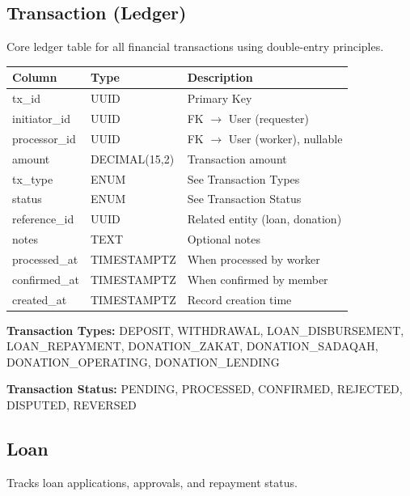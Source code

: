 \documentclass[11pt,a4paper]{article}
\begin{document}
\subsection{Transaction (Ledger)}

Core ledger table for all financial transactions using double-entry principles.

\begin{tabular}{@{}p{4cm}p{3cm}p{6cm}@{}}
\toprule
\textbf{Column} & \textbf{Type} & \textbf{Description} \\
\midrule
tx\_id & UUID & Primary Key \\
initiator\_id & UUID & FK $\rightarrow$ User (requester) \\
processor\_id & UUID & FK $\rightarrow$ User (worker), nullable \\
amount & DECIMAL(15,2) & Transaction amount \\
tx\_type & ENUM & See Transaction Types \\
status & ENUM & See Transaction Status \\
reference\_id & UUID & Related entity (loan, donation) \\
notes & TEXT & Optional notes \\
processed\_at & TIMESTAMPTZ & When processed by worker \\
confirmed\_at & TIMESTAMPTZ & When confirmed by member \\
created\_at & TIMESTAMPTZ & Record creation time \\
\bottomrule
\end{tabular}

\vspace{1em}
\textbf{Transaction Types:} DEPOSIT, WITHDRAWAL, LOAN\_DISBURSEMENT, LOAN\_REPAYMENT, DONATION\_ZAKAT, DONATION\_SADAQAH, DONATION\_OPERATING, DONATION\_LENDING

\textbf{Transaction Status:} PENDING, PROCESSED, CONFIRMED, REJECTED, DISPUTED, REVERSED

\subsection{Loan}

Tracks loan applications, approvals, and repayment status.
\end{document}
